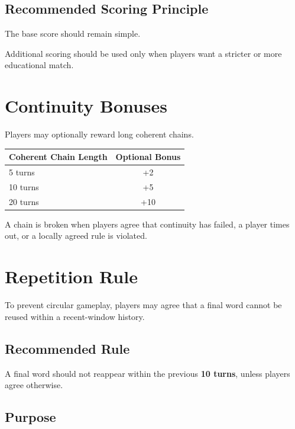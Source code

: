 \documentclass[11pt,a4paper]{article}
\begin{document}
\subsection{Recommended Scoring Principle}

The base score should remain simple.

Additional scoring should be used only when players want a stricter or more educational match.

\section{Continuity Bonuses}

Players may optionally reward long coherent chains.

\begin{center}
\begin{tabular}{lc}
\toprule
\textbf{Coherent Chain Length} & \textbf{Optional Bonus} \\
\midrule
5 turns & +2 \\
10 turns & +5 \\
20 turns & +10 \\
\bottomrule
\end{tabular}
\end{center}

A chain is broken when players agree that continuity has failed, a player times out, or a locally agreed rule is violated.

\section{Repetition Rule}

To prevent circular gameplay, players may agree that a final word cannot be reused within a recent-window history.

\subsection{Recommended Rule}

A final word should not reappear within the previous \textbf{10 turns}, unless players agree otherwise.

\subsection{Purpose}
\end{document}
